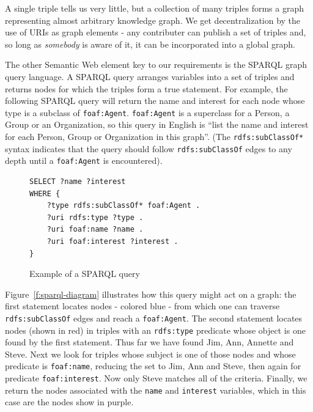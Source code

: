 A single triple tells us very little, but a collection of many triples 
forms a graph representing almost arbitrary knowledge graph. We get 
decentralization by the use of URIs as graph elements - any contributer 
can publish a set of triples and, so long as \emph{somebody} is aware of 
it, it can be incorporated into a global graph.

The other Semantic Web element key to our requirements is the SPARQL 
graph query language. A SPARQL query 
arranges variables into a set of triples and returns nodes for which
the triples form a true statement. For example, the following SPARQL query
will return the name and interest for each node whose type is 
a subclass of \texttt{foaf:Agent}. \texttt{foaf:Agent} is a superclass for a Person, a 
Group or an Organization, so this query in English is ``list the name and 
interest for each Person, Group or Organization in this graph''. (The 
\texttt{rdfs:subClassOf*} syntax indicates that the query should follow 
\texttt{rdfs:subClassOf} edges to any depth until a \texttt{foaf:Agent} 
is encountered).

\begin{figure}[H]
\begin{verbatim}
SELECT ?name ?interest 
WHERE {    
    ?type rdfs:subClassOf* foaf:Agent .
    ?uri rdfs:type ?type .
    ?uri foaf:name ?name .
    ?uri foaf:interest ?interest .
}
\end{verbatim}
\caption{Example of a SPARQL query}
\label{f:sparql}
\end{figure}

Figure~\ref{f:sparql-diagram} illustrates how this query might act on a graph: 
the first statement locates nodes - colored blue - from which one can traverse \texttt{rdfs:subClassOf} edges and reach a \texttt{foaf:Agent}. The second statement 
locates nodes (shown in red) in triples with an \texttt{rdfs:type} predicate whose object 
is one found by the first statement. Thus far we have found Jim, 
Ann, Annette and Steve. Next we look for triples whose subject is one of those nodes
and whose predicate is \texttt{foaf:name}, reducing the set to Jim, Ann and Steve, then
again for predicate \texttt{foaf:interest}. Now only Steve matches all of the criteria.
Finally, we return the nodes associated with the \texttt{name} and \texttt{interest} 
variables, which in this case are the nodes show in purple.

